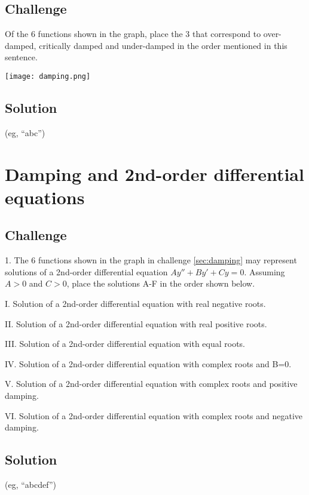 \subsection*{Challenge}
Of the 6 functions shown in the graph, place the 3 that correspond to over-damped, critically damped and under-damped in the order mentioned in this sentence.

\texttt{[image: damping.png]}
\subsection*{Solution}
(eg, ``abc'')





\newpage
\section{Damping and 2nd-order differential equations} %

\subsection*{Challenge}
1. The 6 functions shown in the graph in challenge \ref{sec:damping} may represent solutions of a 2nd-order differential equation $Ay'' + By' + Cy = 0$. Assuming $A>0$ and $C>0$, place the solutions A-F in the order shown below.%

I. Solution of a 2nd-order differential equation with real negative roots.

II. Solution of a 2nd-order differential equation with real positive roots.

III. Solution of a 2nd-order differential equation with equal roots.

IV. Solution of a 2nd-order differential equation with complex roots and B=0.

V. Solution of a 2nd-order differential equation with complex roots and positive damping.

VI. Solution of a 2nd-order differential equation with complex roots and negative damping.

\subsection*{Solution}
(eg, ``abcdef'')

